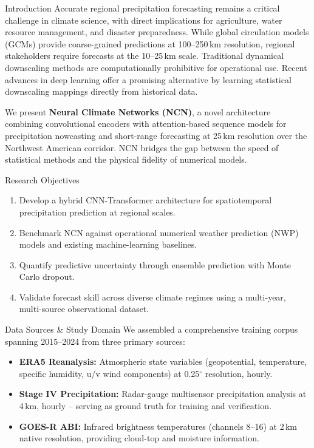 \documentclass{article}
\newcommand{\sectionicon}[1]{\makebox[1.3em][l]{#1}}
\begin{document}
\begin{minipage}[t]{0.485\textwidth}

\begin{posterblock}{\sectionicon{\faLightbulb} Introduction}
Accurate regional precipitation forecasting remains a critical challenge in climate science, with direct implications for agriculture, water resource management, and disaster preparedness. While global circulation models (GCMs) provide coarse-grained predictions at 100--250\,km resolution, regional stakeholders require forecasts at the 10--25\,km scale. Traditional dynamical downscaling methods are computationally prohibitive for operational use. Recent advances in deep learning offer a promising alternative by learning statistical downscaling mappings directly from historical data.

We present \textbf{Neural Climate Networks (NCN)}, a novel architecture combining convolutional encoders with attention-based sequence models for precipitation nowcasting and short-range forecasting at 25\,km resolution over the Northwest American corridor. NCN bridges the gap between the speed of statistical methods and the physical fidelity of numerical models.
\end{posterblock}

\begin{posterblock}{\sectionicon{\faBullseye} Research Objectives}
\begin{enumerate}[leftmargin=*,itemsep=2pt]
  \item Develop a hybrid CNN-Transformer architecture for spatiotemporal precipitation prediction at regional scales.
  \item Benchmark NCN against operational numerical weather prediction (NWP) models and existing machine-learning baselines.
  \item Quantify predictive uncertainty through ensemble prediction with Monte Carlo dropout.
  \item Validate forecast skill across diverse climate regimes using a multi-year, multi-source observational dataset.
\end{enumerate}
\end{posterblock}

\begin{posterblock}{\sectionicon{\faDatabase} Data Sources \& Study Domain}
We assembled a comprehensive training corpus spanning 2015--2024 from three primary sources:

\begin{itemize}[leftmargin=*,itemsep=1pt]
  \item \textbf{ERA5 Reanalysis:} Atmospheric state variables (geopotential, temperature, specific humidity, u/v wind components) at 0.25$^{\circ}$ resolution, hourly.
  \item \textbf{Stage IV Precipitation:} Radar-gauge multisensor precipitation analysis at 4\,km, hourly -- serving as ground truth for training and verification.
  \item \textbf{GOES-R ABI:} Infrared brightness temperatures (channels 8--16) at 2\,km native resolution, providing cloud-top and moisture information.
\end{itemize}


\end{posterblock}
\end{minipage}
\end{document}
